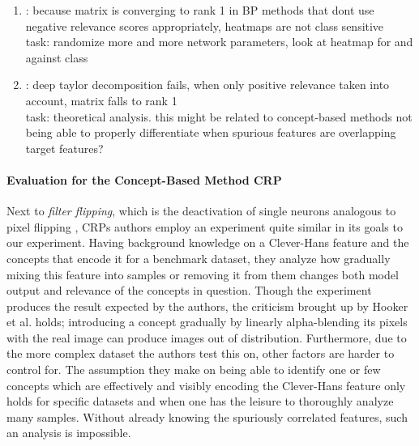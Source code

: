 {\color{gray} 
\begin{enumerate}
      \item \cite{Sixt2020}: because matrix is converging to rank 1 in BP methods that dont use negative relevance scores appropriately, heatmaps are not class sensitive
            \\ task: randomize more and more network parameters, look at heatmap for and against class
      \item \cite{Sixt2022}: deep taylor decomposition fails, when only positive relevance taken into account, matrix falls to rank 1 \\ task: theoretical analysis.  
      this might be related to concept-based methods not being able to properly differentiate when spurious features are overlapping target features?
\end{enumerate}
}

\paragraph{Evaluation for the Concept-Based Method CRP}
Next to \textit{filter flipping}, which is the deactivation of single neurons analogous to pixel flipping \cite{Samek2017a}, CRPs authors employ an experiment quite similar in its goals to our experiment. 
Having background knowledge on a Clever-Hans feature and the concepts that encode it for a benchmark dataset, they analyze how gradually mixing this feature into samples or removing it from them changes both model output and relevance of the concepts in question. 
Though the experiment produces the result expected by the authors, the criticism brought up by Hooker et al. \cite{Hooker2019} holds; introducing a concept gradually by linearly alpha-blending its pixels with the real image can produce images out of distribution. Furthermore, due to the more complex dataset the authors test this on, other factors are harder to control for. The assumption they make on being able to identify one or few concepts which are effectively and visibly encoding the Clever-Hans feature only holds for specific datasets and when one has the leisure to thoroughly analyze many samples. Without already knowing the spuriously correlated features, such an analysis is impossible.  \\

